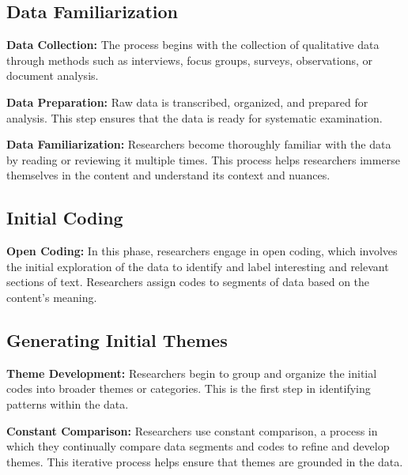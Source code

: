 \documentclass[
  b5paper]{book}
\begin{document}
\hypertarget{data-familiarization}{%
\subsection*{\texorpdfstring{\textbf{Data Familiarization}}{Data Familiarization}}\label{data-familiarization}}

\textbf{Data Collection:} The process begins with the collection of qualitative data through methods such as interviews, focus groups, surveys, observations, or document analysis.

\textbf{Data Preparation:} Raw data is transcribed, organized, and prepared for analysis. This step ensures that the data is ready for systematic examination.

\textbf{Data Familiarization:} Researchers become thoroughly familiar with the data by reading or reviewing it multiple times. This process helps researchers immerse themselves in the content and understand its context and nuances.

\hypertarget{initial-coding}{%
\subsection*{\texorpdfstring{\textbf{Initial Coding}}{Initial Coding}}\label{initial-coding}}

\textbf{Open Coding:} In this phase, researchers engage in open coding, which involves the initial exploration of the data to identify and label interesting and relevant sections of text. Researchers assign codes to segments of data based on the content's meaning.

\hypertarget{generating-initial-themes}{%
\subsection*{\texorpdfstring{\textbf{Generating Initial Themes}}{Generating Initial Themes}}\label{generating-initial-themes}}

\textbf{Theme Development:} Researchers begin to group and organize the initial codes into broader themes or categories. This is the first step in identifying patterns within the data.

\textbf{Constant Comparison:} Researchers use constant comparison, a process in which they continually compare data segments and codes to refine and develop themes. This iterative process helps ensure that themes are grounded in the data.
\end{document}
